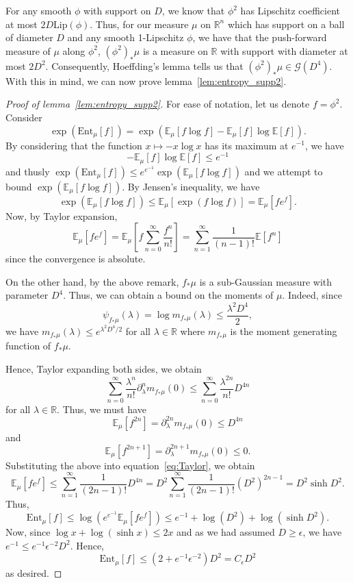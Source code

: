 For any smooth \(\phi\) with support on \(D\), we know that \(\phi^2\) has Lipschitz coefficient 
at most \(2D \text{Lip}(\phi)\). Thus, for our measure \(\mu\) on \(\mathbb{R}^n\) which has support on a ball of diameter \(D\) 
and any smooth 1-Lipschitz \(\phi\), we have that the push-forward measure of \(\mu\) along \(\phi^2\), 
\((\phi^2)_* \mu\) is a measure on \(\mathbb{R}\) with support 
with diameter at most \(2D^2\). Consequently, Hoeffding's lemma tells us that \((\phi^2)_* \mu \in \mathcal{G}(D^4)\).  
With this in mind, we can now prove lemma~\ref{lem:entropy_supp2}.

\begin{proof}[Proof of lemma~\ref{lem:entropy_supp2}]
  For ease of notation, let us denote \(f = \phi^2\). Consider 
  \[\exp(\text{Ent}_\mu[f]) = \exp(\mathbb{E}_\mu[f\log f] - \mathbb{E}_\mu[f]\log\mathbb{E}[f]).\]
  By considering that the function \(x \mapsto -x\log x\) has its maximum at \(e^{-1}\), we have
  \[- \mathbb{E}_\mu[f]\log\mathbb{E}[f] \le e^{-1}\]
  and thusly \(\exp(\text{Ent}_\mu[f]) \le e^{e^{-1}}\exp(\mathbb{E}_\mu[f\log f])\) and 
  we attempt to bound \(\exp(\mathbb{E}_\mu[f\log f])\). By Jensen's inequality, we have 
  \[\exp(\mathbb{E}_\mu[f\log f]) \le \mathbb{E}_\mu[\exp(f\log f)] = \mathbb{E}_\mu[f e^f].\]
  Now, by Taylor expansion,
  \begin{equation}\label{eq:Taylor}
    \mathbb{E}_\mu[f e^f] = \mathbb{E}_\mu\left[f \sum_{n = 0}^\infty \frac{f^n}{n!}\right]
      = \sum_{n = 1}^\infty \frac{1}{(n - 1)!} \mathbb{E}[f^n]
  \end{equation}
  since the convergence is absolute. 

  On the other hand, by the above remark, \(f_* \mu\) is a sub-Gaussian measure with parameter \(D^4\).
  Thus, we can obtain a bound on the moments of \(\mu\). Indeed, since
  \[\psi_{f_*\mu}(\lambda) = \log m_{f_*\mu}(\lambda) \le \frac{\lambda^2 D^4}{2},\]
  we have \(m_{f_*\mu}(\lambda) \le e^{\lambda^2 D^4 / 2}\) for all \(\lambda \in \mathbb{R}\)
  where \(m_{f_*\mu}\) is the moment generating function of \(f_* \mu\).  

  Hence, Taylor expanding both sides, we obtain
  \[\sum_{n = 0}^\infty \frac{\lambda^n}{n!}\partial_\lambda^n m_{f_*\mu}(0) \le \sum_{n = 0}^\infty \frac{\lambda^{2n}}{n!}D^{4n}\]
  for all \(\lambda \in \mathbb{R}\). Thus, we must have 
  \[\mathbb{E}_\mu[f^{2n}] = \partial_\lambda^{2n} m_{f_*\mu}(0) \le D^{4n}\]
  and 
  \[\mathbb{E}_\mu[f^{2n + 1}] = \partial_\lambda^{2n + 1} m_{f_*\mu}(0) \le 0.\]
  Substituting the above into equation~\eqref{eq:Taylor}, we obtain
  \[\mathbb{E}_\mu[fe^f] \le \sum_{n = 1}^\infty \frac{1}{(2n - 1)!}D^{4n}
      = D^2 \sum_{n = 1}^\infty \frac{1}{(2n - 1)!}(D^2)^{2n - 1}
      = D^2 \sinh D^2.\]
  Thus, 
  \[\text{Ent}_\mu[f] \le \log(e^{e^{-1}}\mathbb{E}_\mu[fe^f])
    \le e^{-1} + \log(D^2) + \log (\sinh D^2).\]
  Now, since \(\log x + \log (\sinh x) \le 2x\) and as we had assumed \(D \ge \epsilon\), we have 
  \(e^{-1} \le e^{-1}\epsilon^{-2} D^2\). Hence,
  \[\text{Ent}_\mu[f] \le (2 + e^{-1}\epsilon^{-2})D^2 = C_\epsilon D^2\]
  as desired.
\end{proof}

